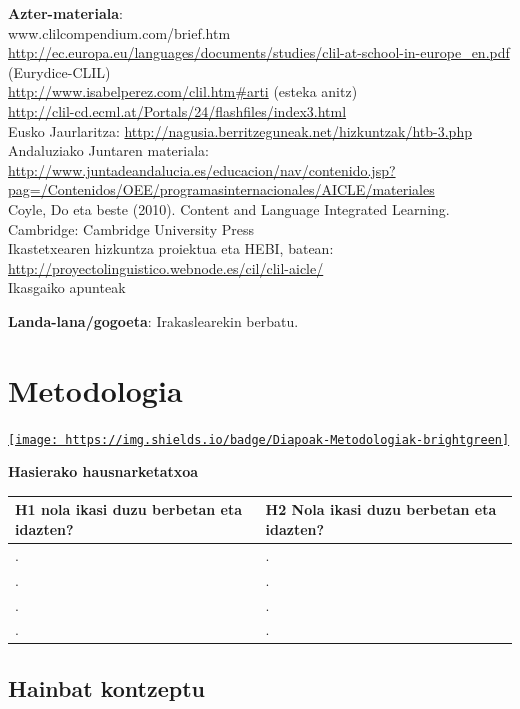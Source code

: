 \documentclass[
]{book}
\begin{document}
\textbf{Azter-materiala}:\\
www.clilcompendium.com/brief.htm\\
\url{http://ec.europa.eu/languages/documents/studies/clil-at-school-in-europe_en.pdf} (Eurydice-CLIL)\\
\url{http://www.isabelperez.com/clil.htm\#arti} (esteka anitz)\\
\url{http://clil-cd.ecml.at/Portals/24/flashfiles/index3.html}~\\
Eusko Jaurlaritza: \url{http://nagusia.berritzeguneak.net/hizkuntzak/htb-3.php}\\
Andaluziako Juntaren materiala: \url{http://www.juntadeandalucia.es/educacion/nav/contenido.jsp?pag=/Contenidos/OEE/programasinternacionales/AICLE/materiales}\\
Coyle, Do eta beste (2010). Content and Language Integrated Learning. Cambridge: Cambridge University Press\\
Ikastetxearen hizkuntza proiektua eta HEBI, batean: \url{http://proyectolinguistico.webnode.es/cil/clil-aicle/}\\
Ikasgaiko apunteak

\textbf{Landa-lana/gogoeta}: Irakaslearekin berbatu.

\hypertarget{metodologia-1}{%
\chapter{Metodologia}\label{metodologia-1}}

\href{../diapoak/07-diapoMetodologiak.html}{\texttt{[image: https://img.shields.io/badge/Diapoak-Metodologiak-brightgreen]}}

\textbf{Hasierako hausnarketatxoa}

\begin{longtable}[]{@{}
  >{\raggedright\arraybackslash}p{}
  >{\raggedright\arraybackslash}p{}@{}}
\toprule
H1 nola ikasi duzu berbetan eta idazten? & H2 Nola ikasi duzu berbetan eta idazten? \\
\midrule
\endhead
. & . \\
. & . \\
. & . \\
. & . \\
\bottomrule
\end{longtable}

\hypertarget{hainbat-kontzeptu}{%
\section{Hainbat kontzeptu}\label{hainbat-kontzeptu}}
\end{document}
